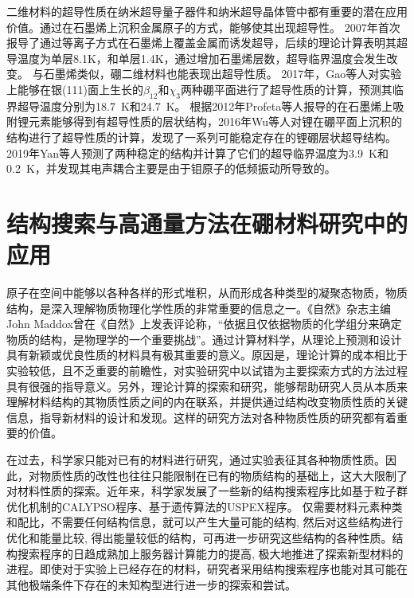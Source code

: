 二维材料的超导性质在纳米超导量子器件\cite{pribiag2015edge}和纳米超导晶体管\cite{el2013superconductivity}中都有重要的潜在应用价值。通过在石墨烯上沉积金属原子的方式，能够使其出现超导性。
2007年首次报导了通过等离子方式在石墨烯上覆盖金属而诱发超导\cite{uchoa2007superconducting}，后续的理论计算表明其超导温度为单层8.1K\cite{gholami2018superconducting}，和单层1.4K\cite{yang2014superconducting}，通过增加石墨烯层数，超导临界温度会发生改变。
与石墨烯类似，硼二维材料也能表现出超导性质。
2017年，Gao等人\cite{gao2017prediction}对实验上能够在银(111)面上生长的$\beta_{12}$和$\chi_3$两种硼平面进行了超导性质的计算，预测其临界超导温度分别为\SI{18.7}{\kelvin}和\SI{24.7}{\kelvin}。
根据2012年Profeta等人\cite{profeta2012phonon}报导的在石墨烯上吸附锂元素能够得到有超导性质的层状结构，2016年Wu等人\cite{wu2016lithium}对锂在硼平面上沉积的结构进行了超导性质的计算，发现了一系列可能稳定存在的锂硼层状超导结构。2019年Yan等人\cite{yan2019prediction}预测了两种稳定的结构并计算了它们的超导临界温度为\SI{3.9}{\kelvin}和\SI{0.2}{\kelvin}，并发现其电声耦合主要是由于钼原子的低频振动所导致的。

\section{结构搜索与高通量方法在硼材料研究中的应用}

原子在空间中能够以各种各样的形式堆积，从而形成各种类型的凝聚态物质，物质结构，是深入理解物质物理化学性质的非常重要的信息之一。《自然》杂志主编John Maddox曾在《自然》上发表评论称，“依据且仅依据物质的化学组分来确定物质的结构，是物理学的一个重要挑战”。通过计算材料学，从理论上预测和设计具有新颖或优良性质的材料具有极其重要的意义。原因是，理论计算的成本相比于实验较低，且不乏重要的前瞻性，对实验研究中以试错为主要探索方式的方法过程具有很强的指导意义。另外，理论计算的探索和研究，能够帮助研究人员从本质来理解材料结构的其物质性质之间的内在联系，并提供通过结构改变物质性质的关键信息，指导新材料的设计和发现。这样的研究方法对各种物质性质的研究都有着重要的价值。

在过去，科学家只能对已有的材料进行研究，通过实验表征其各种物质性质。因此，对物质性质的改性也往往只能限制在已有的物质结构的基础上，这大大限制了对材料性质的探索。近年来，科学家发展了一些新的结构搜索程序比如基于粒子群优化机制的CALYPSO程序\cite{wang2012calypso}、基于遗传算法的USPEX程序\cite{glass2006uspex}。
仅需要材料元素种类和配比，不需要任何结构信息，就可以产生大量可能的结构, 然后对这些结构进行优化和能量比较, 得出能量较低的结构，可再进一步研究这些结构的各种性质。结构搜索程序的日趋成熟加上服务器计算能力的提高, 极大地推进了探索新型材料的进程。即使对于实验上已经存在的材料，研究者采用结构搜索程序也能对其可能在其他极端条件下存在的未知构型进行进一步的探索和尝试。

